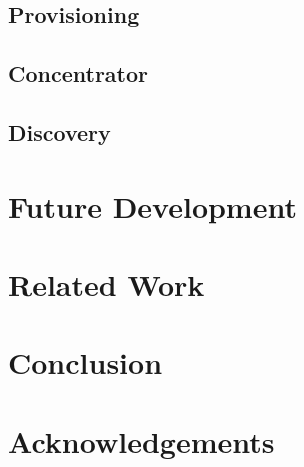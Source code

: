 \documentclass{sig-alternate}
\begin{document}
\subsection{Provisioning}

\subsection{Concentrator}

\subsection{Discovery}

\section{Future Development}

\section{Related Work}

\section{Conclusion}

\section{Acknowledgements}
\end{document}
